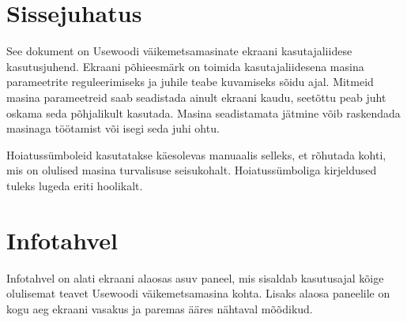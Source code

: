 \documentclass[12pt,a4paper,english]{uvmanual}
\begin{document}





\renewcommand\contentsname{Table of content}         %
\setcounter{tocdepth}{2}                      %
\tableofcontents                              %

\cleardoublepage

\newpage             %
\setcounter{page}{1} %
\renewcommand{\chaptername}{} %

\chapter{Sissejuhatus}

See dokument on Usewoodi väikemetsamasinate ekraani kasutajaliidese kasutusjuhend. Ekraani põhieesmärk on toimida kasutajaliidesena masina parameetrite reguleerimiseks ja juhile teabe kuvamiseks sõidu ajal. Mitmeid masina parameetreid saab seadistada ainult ekraani kaudu, seetõttu peab juht oskama seda põhjalikult kasutada. Masina seadistamata jätmine võib raskendada masinaga töötamist või isegi seda juhi ohtu.

{Hoiatussümboleid kasutatakse käesolevas manuaalis selleks, et rõhutada kohti, mis on olulised masina turvalisuse seisukohalt. Hoiatussümboliga kirjeldused tuleks lugeda eriti hoolikalt.}

\chapter{Infotahvel}\label{ch:taskbar}
Infotahvel on alati ekraani alaosas asuv paneel, mis sisaldab kasutusajal kõige olulisemat teavet Usewoodi väikemetsamasina kohta. Lisaks alaosa paneelile on kogu aeg ekraani vasakus ja paremas ääres nähtaval mõõdikud.

\end{document}
